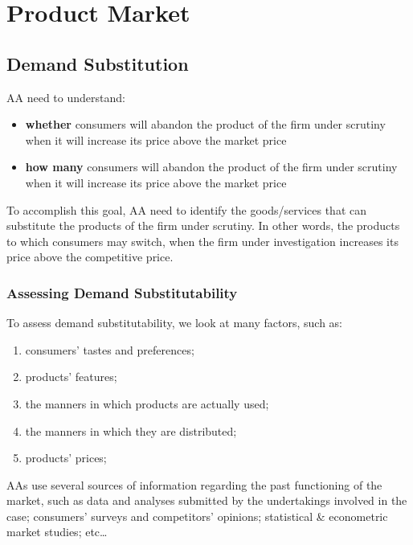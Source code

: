 \section{Product Market}

    \subsection{Demand Substitution}

            AA need to understand:
            \begin{itemize}
                \item \textbf{whether} consumers will abandon the product of the firm under scrutiny when it will increase its price above the market price
                \item \textbf{how many} consumers will abandon the product of the firm under scrutiny when it will increase its price above the market price
            \end{itemize}

            To accomplish this goal, AA need to identify the goods/services that can substitute the products of the firm under scrutiny. In other words, the products to which consumers may switch, when the firm under investigation increases its price above the competitive price.

        \subsubsection{Assessing Demand Substitutability}

            \noindent
            To assess demand substitutability, we look at many factors, such as:
            \begin{enumerate}
                \item consumers’ tastes and preferences;
                \item products' features;
                \item the manners in which products are actually used;
                \item the manners in which they are distributed;
                \item products’ prices;
            \end{enumerate}

            AAs use several sources of information regarding the past functioning of the market, such as data and analyses submitted by the undertakings involved in the case; consumers’ surveys and competitors’ opinions; statistical \& econometric market studies; etc…

